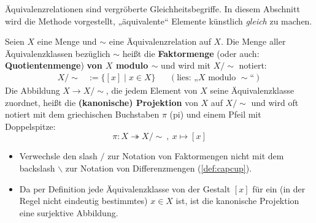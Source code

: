 Äquivalenzrelationen sind vergröberte Gleichheitsbegriffe. In diesem Abschnitt wird die Methode vorgestellt, „äquivalente“ Elemente künstlich \emph{gleich} zu machen.


\begin{defin} \label{def:faktormenge}   
    Seien $X$ eine Menge und $\sim$ eine Äquivalenzrelation auf $X$. Die Menge aller Äquivalenzklassen bezüglich $\sim$ heißt die \textbf{Faktormenge} (oder auch: \textbf{Quotientenmenge}) \textbf{von $X$ modulo $\sim$} und wird mit $X/{\sim}$ notiert:
    \begin{align*}
        X/{\sim} & := \big\{ [x] \mid x\in X \big\} && (\text{lies: „$X$ modulo ${\sim}$“})
    \end{align*}
    Die Abbildung $X\to X/{\sim}$, die jedem Element von $X$ seine Äquivalenzklasse zuordnet, heißt die \textbf{(kanonische) Projektion} von $X$ auf $X/{\sim}$ und wird oft notiert mit dem griechischen Buchstaben $\pi$ (pi) und einem Pfeil mit Doppelspitze:
        \[ \pi : X \twoheadrightarrow X/{\sim}\ ,\ x \mapsto [x] \]
\end{defin}


\begin{bem} \quad
    \begin{itemize}
        \item Verwechsle den slash $\slash$ zur Notation von Faktormengen nicht mit dem backslash $\backslash$ zur Notation von Differenzmengen (\cref{def:capcup}).
        \item Da per Definition jede Äquivalenzklasse von der Gestalt $[x]$ für ein (in der Regel nicht eindeutig bestimmtes) $x\in X$ ist, ist die kanonische Projektion eine surjektive Abbildung.
    \end{itemize}
\end{bem}


